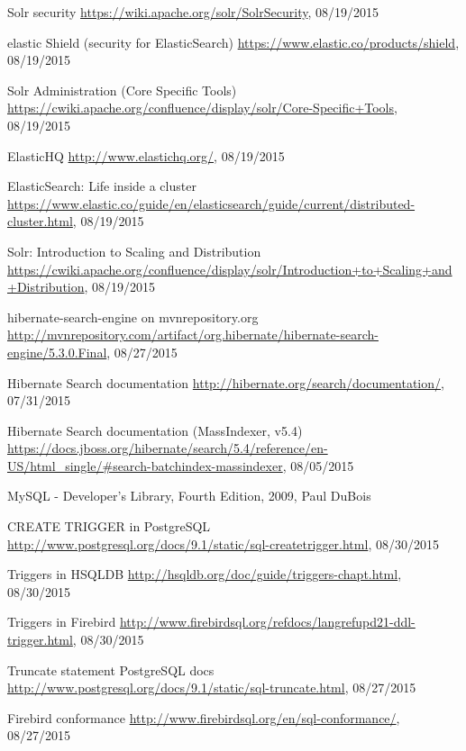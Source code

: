 \begin{thebibliography}{100}
	 Solr security
	\url{https://wiki.apache.org/solr/SolrSecurity}, 08/19/2015
	
	 elastic Shield (security for ElasticSearch)
	\url{https://www.elastic.co/products/shield}, 08/19/2015
	
	 Solr Administration (Core Specific Tools)
	\url{https://cwiki.apache.org/confluence/display/solr/Core-Specific+Tools}, 08/19/2015
	
	 ElasticHQ
	\url{http://www.elastichq.org/}, 08/19/2015
	
	 ElasticSearch: Life inside a cluster
	\url{https://www.elastic.co/guide/en/elasticsearch/guide/current/distributed-cluster.html}, 08/19/2015
	
	 Solr: Introduction to Scaling and Distribution
	\url{https://cwiki.apache.org/confluence/display/solr/Introduction+to+Scaling+and+Distribution}, 08/19/2015
	
	 hibernate-search-engine on mvnrepository.org
	\url{http://mvnrepository.com/artifact/org.hibernate/hibernate-search-engine/5.3.0.Final}, 08/27/2015
	
	 Hibernate Search documentation
	\url{http://hibernate.org/search/documentation/}, 07/31/2015
	
	 Hibernate Search documentation (MassIndexer, v5.4)
	\url{https://docs.jboss.org/hibernate/search/5.4/reference/en-US/html_single/#search-batchindex-massindexer}, 08/05/2015
	
	 MySQL - Developer's Library, Fourth Edition, 2009, Paul DuBois
	
	 CREATE TRIGGER in PostgreSQL
	\url{http://www.postgresql.org/docs/9.1/static/sql-createtrigger.html}, 08/30/2015
	
	 Triggers in HSQLDB
	\url{http://hsqldb.org/doc/guide/triggers-chapt.html}, 08/30/2015
	
	 Triggers in Firebird
	\url{http://www.firebirdsql.org/refdocs/langrefupd21-ddl-trigger.html}, 08/30/2015
	
	 Truncate statement PostgreSQL docs
	\url{http://www.postgresql.org/docs/9.1/static/sql-truncate.html}, 08/27/2015
	
	 Firebird conformance
	\url{http://www.firebirdsql.org/en/sql-conformance/}, 08/27/2015
	

\end{thebibliography}
